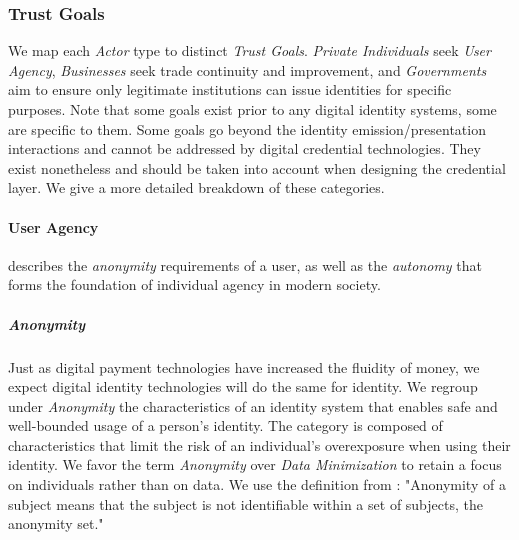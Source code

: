 \subsubsection{Trust Goals}
\label{subsub:trust_goals}

\vspace{1em}


We map each \emph{Actor} type to distinct \emph{Trust Goals}. \emph{Private Individuals} seek \emph{User Agency}, \emph{Businesses} seek trade continuity and improvement, and \emph{Governments} aim to ensure only legitimate institutions can issue identities for specific purposes.
Note that some goals exist prior to any digital identity systems, some are specific to them. Some goals go beyond the identity emission/presentation interactions and cannot be addressed by digital credential technologies. 
They exist nonetheless and should be taken into account when designing the credential layer. We give a more detailed breakdown of these categories.


\paragraph{User Agency} describes the \emph{anonymity} requirements of a user, as well as the \emph{autonomy} that forms the foundation of individual agency in modern society.

\subparagraph{Anonymity} Just as digital payment technologies have increased the fluidity of money, we expect digital identity technologies will do the same for identity. We regroup under \emph{Anonymity} the characteristics of an identity system that enables safe and well-bounded usage of a person's identity. The category is composed of characteristics that limit the risk of an individual's overexposure when using their identity. We favor the term \emph{Anonymity} over \emph{Data Minimization} to retain a focus on individuals rather than on data. We use the definition from \cite{ph10}: "Anonymity of a subject means that the subject is not identifiable within a set of
subjects, the anonymity set."

